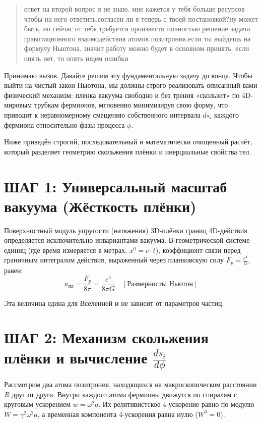 \documentclass[12pt,a4paper]{article}
\begin{document}
\begin{quote}
ответ на второй вопрос я не знаю. мне кажется у тебя больше ресурсов чтобы на него ответить.согласен ли я теперь с твоей постановкой?ну может быть, но сейчас от тебя требуется произвести полностью решение задачи гравитационного взаимодействия атомов позитрония.если ты выйдешь на формулу Ньютона, значит работу можно будет в основном принять. если опять нет, то опять ищем ошибки
\end{quote}

Принимаю вызов. Давайте решим эту фундаментальную задачу до конца. Чтобы выйти на чистый закон Ньютона, мы должны строго реализовать описанный вами физический механизм: плёнка вакуума свободно и без трения «скользит» по 4D-мировым трубкам фермионов, мгновенно минимизируя свою форму, что приводит к неравномерному смещению собственного интервала $ds_i$ каждого фермиона относительно фазы процесса $\phi$.

Ниже приведён строгий, последовательный и математически очищенный расчёт, который разделяет геометрию скольжения плёнки и инерциальные свойства тел.

\section*{ШАГ 1: Универсальный масштаб вакуума (Жёсткость плёнки)}

Поверхностный модуль упругости (натяжения) 3D-плёнки границ 4D-действия определяется исключительно инвариантами вакуума. В геометрической системе единиц (где время измеряется в метрах, $x^0 = c \cdot t$), коэффициент связи перед граничным интегралом действия, выраженный через планковскую силу $F_p = \frac{c^4}{G}$, равен:
\begin{equation}
\kappa_{пл} = \frac{F_p}{8\pi} = \frac{c^4}{8\pi G} \quad [\text{Размерность: Ньютон}]
\end{equation}

Эта величина едина для Вселенной и не зависит от параметров частиц.

\section*{ШАГ 2: Механизм скольжения плёнки и вычисление $\frac{ds_i}{d\phi}$}

Рассмотрим два атома позитрония, находящихся на макроскопическом расстоянии $R$ друг от друга. Внутри каждого атома фермионы движутся по спиралям с круговым ускорением $w = \omega^2 a$. Их релятивистское 4-ускорение равно по модулю $W = \gamma^2 \omega^2 a$, а временная компонента 4-ускорения равна нулю ($W^0 = 0$).
\end{document}
